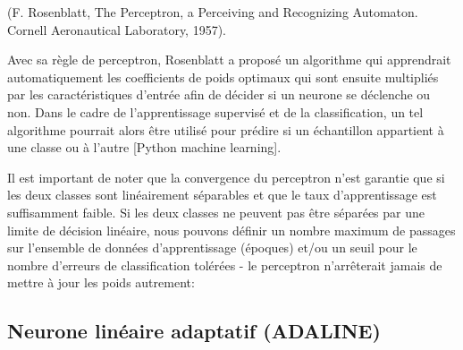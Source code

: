 	(F. Rosenblatt, The Perceptron, a Perceiving and Recognizing Automaton. Cornell Aeronautical Laboratory, 1957).
	
	Avec sa règle de perceptron, Rosenblatt a proposé un algorithme qui apprendrait automatiquement les coefficients de poids optimaux qui sont ensuite multipliés par les caractéristiques d'entrée afin de décider si un neurone se déclenche ou non. Dans le cadre de l'apprentissage supervisé et de la classification, un tel algorithme pourrait alors être utilisé pour prédire si un échantillon appartient à une classe ou à l'autre [Python machine learning].
	
	Il est important de noter que la convergence du perceptron n'est garantie que si les deux classes sont linéairement séparables et que le taux d'apprentissage est suffisamment faible. Si les deux classes ne peuvent pas être séparées par une limite de décision linéaire, nous pouvons définir un nombre maximum de passages sur l'ensemble de données d'apprentissage (époques) et/ou un seuil pour le nombre d'erreurs de classification tolérées - le perceptron n'arrêterait jamais de mettre à jour les poids autrement:
	
	\subsection{Neurone linéaire adaptatif (ADALINE)}
	\lipsum[1]
